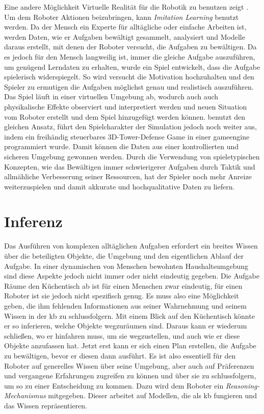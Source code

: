 Eine andere Möglichkeit Virtuelle Realität für die Robotik zu benutzen zeigt \cite{imitationLearning2}. Um dem Roboter Aktionen beizubringen, kann \textit{Imitation Learning} benutzt werden. Da der Mensch ein Experte für alltägliche oder einfache Arbeiten ist, werden Daten, wie er Aufgaben bewältigt gesammelt, analysiert und Modelle daraus erstellt, mit denen der Roboter versucht, die Aufgaben zu bewältigen. Da es jedoch für den Mensch langweilig ist, immer die gleiche Aufgabe auszuführen, um genügend Lerndaten zu erhalten, wurde ein Spiel entwickelt, dass die Aufgabe spielerisch widerspiegelt. So wird versucht die Motivation hochzuhalten und den Spieler zu ermutigen die Aufgaben möglichst genau und realistisch auszuführen. Das Spiel läuft in einer virtuellen Umgebung ab, wodurch auch auch physikalische Effekte observiert und interpretiert werden und neuen Situation vom Roboter erstellt und dem Spiel hinzugefügt werden können. \newline
\cite{imitationLearning1} benutzt den gleichen Ansatz, führt den Spielcharakter der Simulation jedoch noch weiter aus, indem ein freihändig steuerbares 3D-Tower-Defense Game in einer \gls{gameengine} programmiert wurde. Damit können die Daten aus einer kontrollierten und sicheren Umgebung gewonnen werden. Durch die Verwendung von spieletypischen Konzepten, wie das Bewältigen immer schwierigerer Aufgaben durch Taktik und allmähliche Verbesserung seiner Ressourcen, hat der Spieler noch mehr Anreize weiterzuspielen und damit akkurate und hochqualitative Daten zu liefern. 


\section{Inferenz}

Das Ausführen von komplexen alltäglichen Aufgaben erfordert ein breites Wissen über die beteiligten Objekte, die Umgebung und den eigentlichen Ablauf der Aufgabe. In einer dynamischen von Menschen bewohnten Haushaltsumgebung sind diese Aspekte jedoch nicht immer oder nicht eindeutig gegeben. Die Aufgabe \glqq Räume den Küchentisch ab\grqq \xspace ist für einen Menschen zwar eindeutig, für einen Roboter ist sie jedoch nicht spezifisch genug. Es muss also eine Möglichkeit geben, die ihm fehlenden Informationen aus seiner Wahrnehmung und seinem  Wissen in der \gls{kb} zu schlussfolgern. Mit einem Blick auf den Küchentisch könnte er so inferieren, welche Objekte wegzuräumen sind. Daraus kann er wiederum schließen, wo er hinfahren muss, um sie wegzustellen, und auch wie er diese Objekte anzufassen hat. Jetzt erst kann er sich einen Plan erstellen, die Aufgabe zu bewältigen, bevor er diesen dann ausführt. Es ist also essentiell für den Roboter auf generelles Wissen über seine Umgebung, aber auch auf Präferenzen und vergangene Erfahrungen zugreifen zu können und über sie zu schlussfolgern, um so zu einer Entscheidung zu kommen. Dazu wird dem Roboter ein \textit{Reasoning-Mechanismus} mitgegeben. Dieser arbeitet auf Modellen, die als \gls{kb} fungieren und das Wissen repräsentieren. \cite{Tenorth2010}    \par

